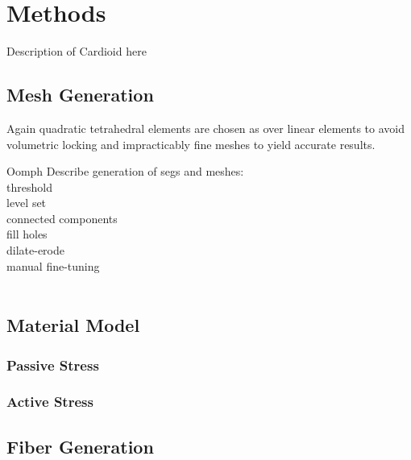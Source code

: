 \section{Methods}
\label{Methods}

Description of Cardioid here

\subsection{Mesh Generation}
\label{Mesh Generation}

Again quadratic tetrahedral elements are chosen as over linear elements to avoid volumetric locking and impracticably fine meshes to yield accurate results.

Oomph
Describe generation of segs and meshes: \\
threshold \\
level set \\
connected components \\
fill holes \\
dilate-erode \\
manual fine-tuning \\

~

\subsection{Material Model}
\label{Material Model}

\subsubsection{Passive Stress}
\label{Passive Stress}

\subsubsection{Active Stress}
\label{Active Stress}

\subsection{Fiber Generation}
\label{Fiber Generation}


